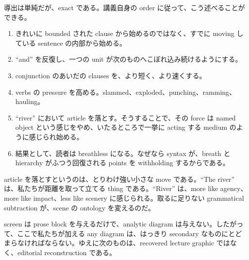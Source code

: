 導出は単純だが、exact である。講義自身の order に従って、こう述べることができる。
\begin{enumerate}
\item きれいに bounded された clause から始めるのではなく、すでに moving している sentence の内部から始める。
\item ``and'' を反復し、一つの unit が次のものへこぼれ込み続けるようにする。
\item conjunction のあいだの clauses を、より短く、より速くする。
\item verbs の pressure を高める。slammed、exploded、punching、ramming、hauling。
\item ``river'' において article を落とす。そうすることで、その force は named object という感じをやめ、いたるところで一挙に acting する medium のように感じられ始める。
\item 結果として、読者は breathless になる。なぜなら syntax が、breath と hierarchy がふつう回復される points を withholding するからである。
\end{enumerate}

article を落とすというのは、とりわけ強い小さな move である。``The river'' は、私たちが距離を取って立てる thing である。``River'' は、more like agency、more like impact、less like scenery に感じられる。取るに足りない grammatical subtraction が、scene の ontology を変えるのだ。

screen は prose block を与えるだけで、analytic diagram は与えない。したがって、ここで私たちが加える any diagram は、はっきり secondary なものにとどまらなければならない。ゆえに次のものは、recovered lecture graphic ではなく、editorial reconstruction である。

